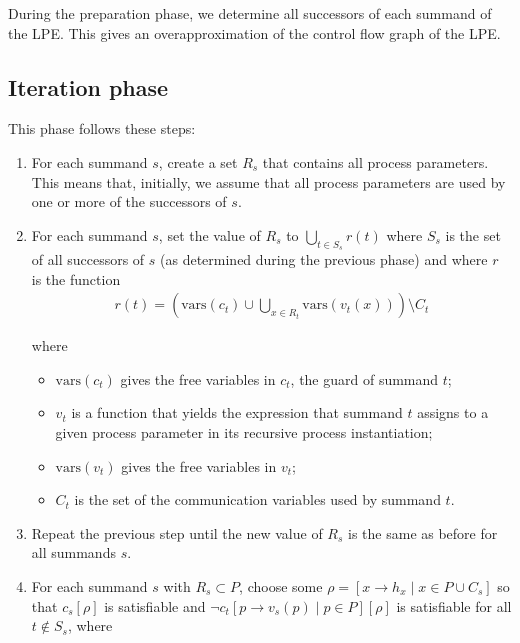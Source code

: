 During the preparation phase, we determine all successors of each summand of the LPE.
This gives an overapproximation of the control flow graph of the LPE.

\subsection{Iteration phase}

This phase follows these steps:

\begin{enumerate}

\item For each summand $s$, create a set $R_s$ that contains all process parameters.
This means that, initially, we assume that all process parameters are used by one or more of the successors of $s$.

\item For each summand $s$, set the value of $R_s$ to $\bigcup\limits_{t \in S_s}^{} r(t)$ where $S_s$ is the set of all successors of $s$ (as determined during the previous phase) and where $r$ is the function
\begin{align*}
r(t) = \left( \text{vars}(c_t) \cup \bigcup\limits_{x \in R_t}^{} \text{vars}(v_t(x)) \right) \setminus C_t
\end{align*}

where

\begin{itemize}
\item $\text{vars}(c_t)$ gives the free variables in $c_t$, the guard of summand $t$;
\item $v_t$ is a function that yields the expression that summand $t$ assigns to a given process parameter in its recursive process instantiation;
\item $\text{vars}(v_t)$ gives the free variables in $v_t$;
\item $C_t$ is the set of the communication variables used by summand $t$.
\end{itemize}

\item Repeat the previous step until the new value of $R_s$ is the same as before for all summands $s$.

\item For each summand $s$ with $R_s \subset P$, choose some $\rho = [x \rightarrow h_x \;|\; x \in P \cup C_s]$ so that ${c_s}[\rho]$ is satisfiable and $\neg{c_t}[p \rightarrow v_s(p) \;|\; p \in P][\rho]$ is satisfiable for all $t \notin S_s$, where


\end{enumerate}
